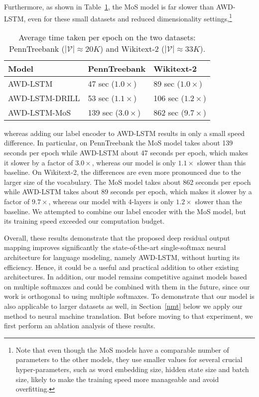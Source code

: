 \documentclass{article}
\begin{document}
Furthermore, as shown in Table~\ref{table:speed}, the MoS model is far slower than AWD-LSTM, even for these small datasets and reduced dimensionality settings,\footnote{
Note that even though the MoS models have a comparable number of parameters to the other models, they use smaller values for several crucial hyper-parameters, such as word embedding size, hidden state size and batch size, likely to make the training speed more manageable and avoid overfitting.  
}\begin{table}[htp]\centering
	\small
	 {\def\arraystretch{1.1}\tabcolsep=3.5pt\begin{tabular}{l|ll}
		\toprule
		\bf Model     & \bf PennTreebank &  \bf Wikitext-2 \\
		\midrule
		AWD-LSTM       & 47 sec ($1.0\times$) & 89 sec ($1.0\times$) \\
		AWD-LSTM-DRILL & 53 sec ($1.1\times$) & 106 sec ($1.2\times$) \\
		AWD-LSTM-MoS   & 139 sec ($3.0\times$) & 862 sec ($9.7\times$)\\
 		\bottomrule
	\end{tabular}} 
	\vspace{-1mm}
	\caption{\small 
		Average time taken per epoch on the two datasets: PennTreebank ($|\mathcal{V}|\approx20K$) and Wikitext-2 ($|\mathcal{V}|\approx33K$). 
	} 
	\vspace{-6mm}
	\label{table:speed}
\end{table}
whereas adding our label encoder to AWD-LSTM results in only a small speed difference. In particular, on PennTreebank the MoS model takes about 139 seconds per epoch while AWD-LSTM about 47 seconds per epoch, which makes it slower by a factor of $3.0\times$, whereas our model is only $1.1\times$ slower than this baseline.  On Wikitext-2, the differences are even more pronounced due to the larger size of the vocabulary.  The MoS model takes about 862 seconds per epoch while AWD-LSTM takes about 89 seconds per epoch, which makes it slower by a factor of $9.7\times$, whereas our model with 4-layers is only $1.2\times$ slower than the baseline. We attempted to combine our label encoder with the MoS model, but its training speed exceeded our computation budget. 

Overall, these results demonstrate that the proposed deep residual output mapping improves significantly the state-of-the-art single-softmax neural architecture for language modeling, namely AWD-LSTM, without hurting its efficiency.  Hence, it could be a useful and practical addition to other existing architectures. In addition, our model remains competitive against models based on multiple softmaxes and could be combined with them in the future, since our work is orthogonal to using multiple softmaxes. To demonstrate that our model is also applicable to larger datasets as well, in Section~\ref{nmt} below we apply our method to neural machine translation. But before moving to that experiment, we first perform an ablation analysis of these results. 
\end{document}
